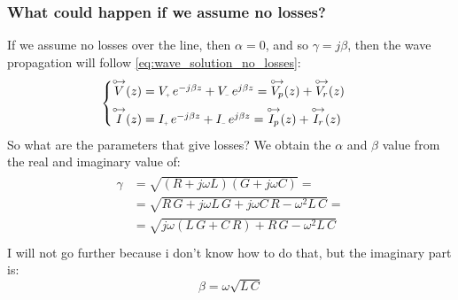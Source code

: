 \subsubsection*{What could happen if we assume no losses?}
If we assume no losses over the line, then $\alpha=0$, and so $\gamma = j\beta$, then the wave propagation will follow \cref{eq:wave_solution_no_losses}:
\begin{equation}
  \begin{cases}
  \phas{V}(z)=V\bottomPlus \,e^{-j\beta z}+V\bottomMinus \,e^{j\beta z}=\phas{V_p}(z)+\phas{V_r}(z)\\[5pt]
  \phas{I}(z)=I\bottomPlus \,e^{-j\beta z}+I\bottomMinus \,e^{j\beta z}=\phas{I_p}(z)+\phas{I_r}(z)
  \end{cases}\label{eq:wave_solution_no_losses}
\end{equation}
So what are the parameters that give losses? We obtain the $\alpha$ and $\beta$ value from the real and imaginary value of:
\begin{align}
  \begin{split}
    \gamma &=\sqrt{(R+j\omega L)(G+j\omega C)}=\\[5pt]
    &=\sqrt{R\,G+j\omega L\,G+j\omega C\,R-\omega^2L\,C}=\\[5pt]
    &=\sqrt{j\omega( L\,G + C\,R)+R\,G-\omega^2L\,C}\\[5pt]
  \end{split}
\end{align}
I will not go further because i don't know how to do that, but the imaginary part is:
\begin{equation}
  \beta=\omega\sqrt{L\,C}
\end{equation}